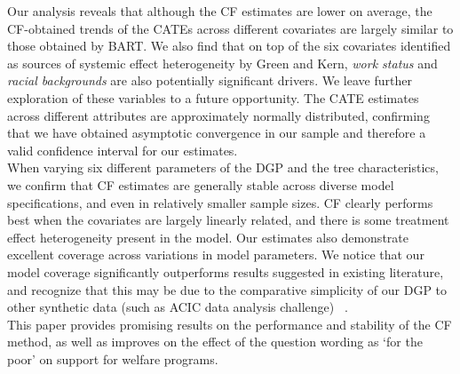 \documentclass[12pt]{article}
\begin{document}
Our analysis reveals that although the CF estimates are lower on average, the CF-obtained trends of the CATEs across different covariates are largely similar to those obtained by BART. We also find that on top of the six covariates identified as sources of systemic effect heterogeneity by Green and Kern, \textit{work status} and \textit{racial backgrounds} are also potentially significant drivers. We leave further exploration of these variables to a future opportunity. The CATE estimates across different attributes are approximately normally distributed, confirming that we have obtained asymptotic convergence in our sample and therefore a valid confidence interval for our estimates. \\ 

When varying six different parameters of the DGP and the tree characteristics, we confirm that CF estimates are generally stable across diverse model specifications, and even in relatively smaller sample sizes. CF clearly performs best when the covariates are largely linearly related, and there is some treatment effect heterogeneity present in the model. Our estimates also demonstrate excellent coverage across variations in model parameters. We notice that our model coverage significantly outperforms results suggested in existing literature, and recognize that this may be due to the comparative simplicity of our DGP to other synthetic data (such as ACIC data analysis challenge) ~\cite{dorieACIC}. \\

This paper provides promising results on the performance and stability of the CF method, as well as improves on the effect of the question wording as `for the poor' on support for welfare programs. 
\end{document}
